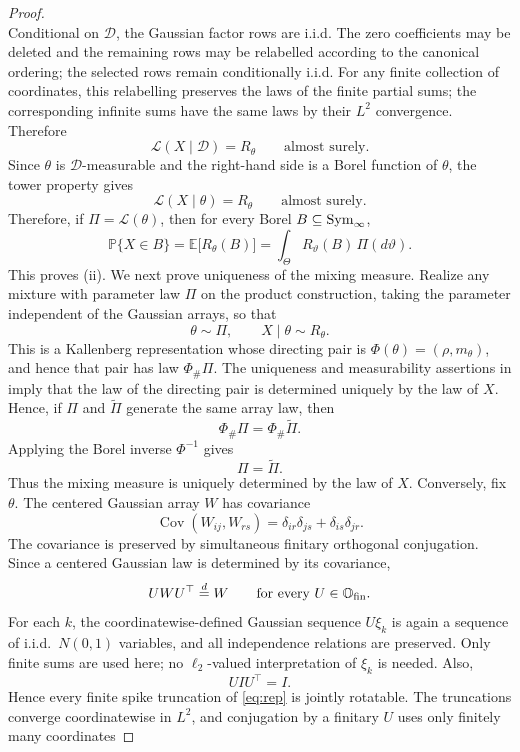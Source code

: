 \begin{proof}
\[\]
Conditional on \(\mathcal D\), the Gaussian factor rows are i.i.d.
The zero coefficients may be deleted and the remaining rows may be
relabelled according to the canonical ordering; the selected rows
remain conditionally i.i.d. For any finite collection of coordinates,
this relabelling preserves the laws of the finite partial sums; the
corresponding infinite sums have the same laws by their \(L^2\)
convergence. Therefore
\[
\mathcal L(X\mid\mathcal D)
=
R_\theta
\qquad\text{almost surely}.
\]
Since \(\theta\) is \(\mathcal D\)-measurable and the right-hand side
is a Borel function of \(\theta\), the tower property gives
\[
\mathcal L(X\mid\theta)
=
R_\theta
\qquad\text{almost surely}.
\]
Therefore, if \(\Pi=\mathcal L(\theta)\), then for every Borel
\(B\subseteq\mathrm{Sym}_\infty\),
\[
\mathbb P\{X\in B\}
=
\mathbb E\bigl[R_\theta(B)\bigr]
=
\int_\Theta R_\vartheta(B)\,\Pi(d\vartheta).
\]
This proves \textup{(ii)}.
We next prove uniqueness of the mixing measure. Realize any mixture
with parameter law \(\Pi\) on the product construction, taking the
parameter independent of the Gaussian arrays, so that
\[
\theta\sim\Pi,
\qquad
X\mid\theta\sim R_\theta.
\]
This is a Kallenberg representation whose directing pair is
\(\Phi(\theta)=(\rho,m_\theta)\), and hence that pair has law
\(\Phi_\#\Pi\). The uniqueness and measurability assertions in
\citep[Theorem~5.1]{kallenberg1988some} imply that the law of the
directing pair is determined uniquely by the law of \(X\). Hence, if
\(\Pi\) and \(\widetilde\Pi\) generate the same array law, then
\[
\Phi_\#\Pi
=
\Phi_\#\widetilde\Pi.
\]
Applying the Borel inverse \(\Phi^{-1}\) gives
\[
\Pi=\widetilde\Pi.
\]
Thus the mixing measure is uniquely determined by the law of \(X\).
Conversely, fix \(\theta\). The centered Gaussian array \(W\) has
covariance
\[
\operatorname{Cov}(W_{ij},W_{rs})
=
\delta_{ir}\delta_{js}
+\delta_{is}\delta_{jr}.
\]
The covariance is preserved by simultaneous finitary orthogonal
conjugation. Since a centered Gaussian law is determined by its
covariance,
\[
UWU^\top\overset{d}=W
\qquad\text{for every }U\in\mathbb{O}_{\mathrm{fin}}.
\]
For each \(k\), the coordinatewise-defined Gaussian sequence
\(U\xi_k\) is again a sequence of i.i.d.\ \(N(0,1)\) variables, and
all independence relations are preserved. Only finite sums are used
here; no \(\ell_2\)-valued interpretation of \(\xi_k\) is needed.
Also,
\[
UIU^\top=I.
\]
Hence every finite spike truncation of \eqref{eq:rep} is jointly
rotatable. The truncations converge coordinatewise in \(L^2\), and
conjugation by a finitary \(U\) uses only finitely many coordinates

\end{proof}
